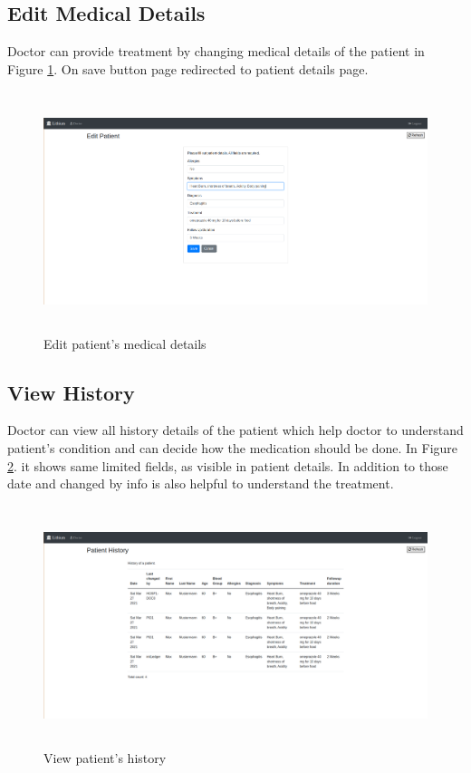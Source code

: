 \subsection{Edit Medical Details}
Doctor can provide treatment by changing medical details of the patient in Figure \ref{fig:chapter04:doctor5}. On save button page redirected to patient details page.

\begin{figure}[htbp]
 \centering
 \includegraphics[width=1.1\textwidth, height=7cm]{gfx/figures/doctor5.png}
 \caption{Edit patient's medical details}
 \label{fig:chapter04:doctor5}
\end{figure}

\subsection{View History}
Doctor can view all history details of the patient which help doctor to understand patient's condition and can decide how the medication should be done. In Figure \ref{fig:chapter04:doctor6}. it shows same limited fields, as visible in patient details. In addition to those date and changed by info is also helpful to understand the treatment. 

\begin{figure}[htbp]
 \centering
 \includegraphics[width=1.1\textwidth, height=7cm]{gfx/figures/doctor6.png}
 \caption{View patient's history}
 \label{fig:chapter04:doctor6}
\end{figure}




